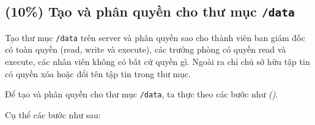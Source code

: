 \subsection{(10\%) Tạo và phân quyền cho thư mục \texttt{/data}}

Tạo thư mục \texttt{/data} trên server và phân quyền sao cho thành viên ban
giám đốc có toàn quyền (read, write và execute), các trưởng phòng có quyền read và
execute, các nhân viên không có bất cứ quyền gì. Ngoài ra chỉ chủ sở hữu tập tin có
quyền xóa hoặc đổi tên tập tin trong thư mục.


Để tạo và phân quyền cho thư mục \texttt{/data}, ta thực theo các bước như \textit{()}.





Cụ thể các bước như sau:

